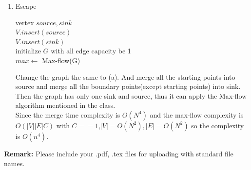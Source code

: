 \documentclass[12pt,a4paper]{article}
\makeatletter
\newtheorem*{solution}{Solution}
\theoremstyle{definition}
\renewenvironment{solution}[1][Solution] {\par\pushQED{\qed}\normalfont\topsep6\p@\@plus6\p@\relax\trivlist\item[\hskip\labelsep\bfseries#1\@addpunct{.}]\ignorespaces}{\popQED\endtrivlist\@endpefalse} \makeatother
\makeatother
\begin{document}
\begin{enumerate}
\begin{solution}
\begin{algorithm}[H]
    \caption{Escape}\label{flow}
    vertex $source,sink$\\
    $V.insert(source)$\\
    $V.insert(sink)$\\
    initialize $G$ with all edge capacity be 1\\
    $max\leftarrow$ Max-flow(G)\\
	\end{algorithm}
    Change the graph the same to (a). And merge all the starting points into source and merge all the boundary points(except starting points) into sink. Then the graph has only one sink and source, thus it can apply the Max-flow algorithm mentioned in the class.\\
    Since the merge time complexity is $O(N^4)$ and the max-flow complexity is $O(|V||E|C)$ with $C==1$,$|V|=O(N^2),|E|=O(N^2)$ so the complexity is $O(n^4)$.
    \end{solution}
    
\end{enumerate}

\textbf{Remark:} Please include your .pdf, .tex files for uploading with standard file names.
\newpage


\end{document}
